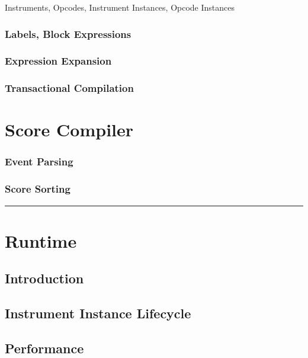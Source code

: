 \documentclass[]{book}
\begin{document}
Instruments, Opcodes, Instrument Instances, Opcode Instances

\subsection{Labels, Block Expressions}

\subsection{Expression Expansion}

\subsection{Transactional Compilation}


\chapter{Score Compiler}

\subsection{Event Parsing}

\subsection{Score Sorting}

\begin{center}\rule{3in}{0.4pt}\end{center}


\chapter{Runtime}

\section{Introduction}

\section{Instrument Instance Lifecycle}

\section{Performance}
\end{document}
